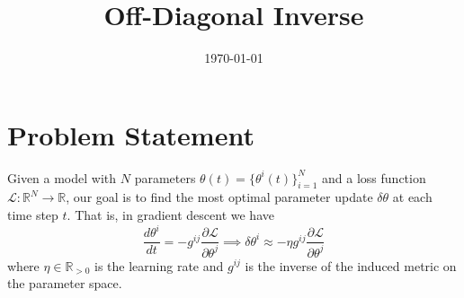 \documentclass{article}
\title{Off-Diagonal Inverse}
\date{\today}
\newcommand{\loss}{\mathcal{L}}
\begin{document}
\section{Problem Statement}
Given a model with $N$ parameters $\theta(t)=\{\theta^i(t)\}_{i=1}^N$ and a loss function 
$\loss:\mathbb{R}^N\to\mathbb{R}$, 
our goal is to find the most optimal parameter update $\delta \theta$ at each time step $t$.
That is, in gradient descent we have $$
    \frac{d \theta^i}{dt} = - g^{ij} \frac{\partial \loss}{\partial \theta^j} 
    \implies 
    \delta \theta^i \approx - \eta g^{ij} \frac{\partial \loss}{\partial \theta^j}
$$ where $\eta\in\mathbb{R}_{>0}$ is the learning rate and $g^{ij}$ is the inverse of the induced metric on the parameter space.



\end{document}

